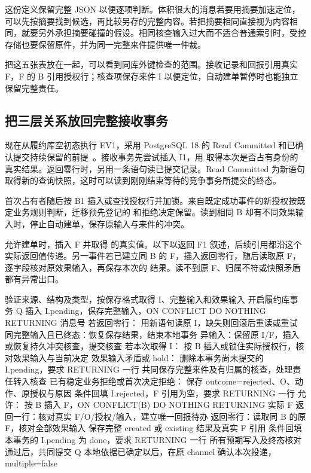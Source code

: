 这份定义保留完整 JSON 以便逐项判断。体积很大的消息若要用摘要加速定位，可以先按摘要找到候选，再比较另存的完整内容。若把摘要相同直接视为内容相同，就要另外承担摘要碰撞的假设。相同核查输入过大而不适合普通索引时，受控存储也要保留原件，并为同一完整来件提供唯一仲裁。

把这五张表放在一起，可以看到同库外键检查的范围。接收记录和回报引用真实 F，F 的 B 引用授权行；核查项保存来件 I 以便定位，自动建单暂停时也能独立保留完整责任。


\subsection*{把三层关系放回完整接收事务}

现在从履约库空初态执行 EV1，采用 PostgreSQL 18 的 Read Committed 和已确认提交持续保留的前提~\cite{pg}。接收事务先尝试插入 I1，用  取得本次是否占有身份的真实结果。返回零行时，另用一条语句读已提交记录。Read Committed 为新语句取得新的查询快照，这时可以读到刚刚结束等待的竞争事务所提交的终态。

首次占有者随后按 B1 插入或查找授权行并加锁。来自既定成功事件的新授权按既定业务规则判断，迁移预先登记的  和拒绝决定保留。读到相同 B 却有不同效果输入时，停止自动建单，保存原输入与来件的冲突。

允许建单时，插入 F 并取得  的真实值。以下以返回 F1 叙述，后续引用都沿这个实际返回值传递。另一事件若已建立同 B 的 F，插入返回零行，随后读取原 F，逐字段核对原效果输入，再保存本次的  结果。读不到原 F、归属不符或快照矛盾都有异常出口。

\begin{BookCode}
验证来源、结构及类型，按保存格式取得 I、完整输入和效果输入
开启履约库事务 Q
插入 I.pending，保存完整输入，ON CONFLICT DO NOTHING RETURNING 消息号
若返回零行：
    用新语句读原 I，缺失则回滚后重读或重试
    同完整输入且已终态：恢复保存结果，结束本地事务
    异输入：保留原 I/F，插入或恢复持久冲突核查，提交核查
若本次取得 I：
    按 B 插入或锁住实际授权行，核对效果输入与当前决定
    效果输入矛盾或 hold：
        删除本事务尚未提交的 I.pending，要求 RETURNING 一行
        共同保存完整来件及有归属的核查，处理责任转入核查
    已有稳定业务拒绝或首次决定拒绝：
        保存 outcome=rejected、O、动作、原授权与原因
        条件回填 I.rejected，F 引用为空，要求 RETURNING 一行
    允许：
        按 B 插入 F，ON CONFLICT(B) DO NOTHING RETURNING 实际 F
        返回一行：核对真实 F/O/授权/输入，建立唯一回报待办
        返回零行：读取同 B 的原 F，核对全部效果输入
        保存完整 created 或 existing 结果及真实 F 引用
        条件回填本事务的 I.pending 为 done，要求 RETURNING 一行
    所有预期写入及终态核对通过后，共同提交 Q
本地依据已确定以后，在原 channel 确认本次投递，multiple=false
\end{BookCode}

